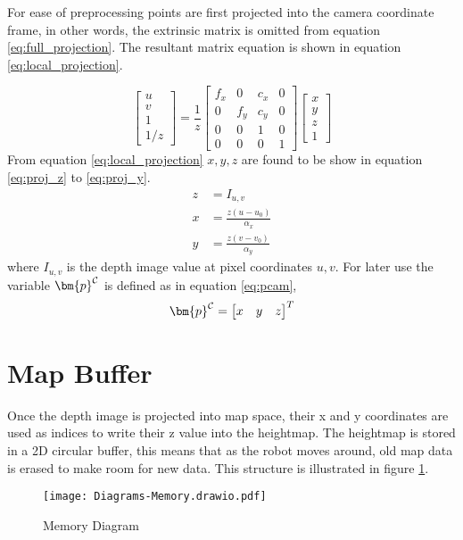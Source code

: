 For ease of preprocessing points are first projected into the camera coordinate frame, in other words, the extrinsic matrix is omitted from equation \ref{eq:full_projection}.
The resultant matrix equation is shown in equation \ref{eq:local_projection}.

\begin{equation} \label{eq:local_projection}
    \begin{bmatrix}
        u \\
        v \\
        1 \\
        1/z
    \end{bmatrix}
    = \frac{1}{z}
    \begin{bmatrix}
        f_x & 0 & c_x & 0 \\
        0 & f_y & c_y & 0 \\
        0 & 0 & 1 & 0 \\
        0 & 0 & 0 & 1
    \end{bmatrix}
    \begin{bmatrix}
        x\\
        y\\
        z\\
        1
    \end{bmatrix}
\end{equation}
From equation \ref{eq:local_projection} \(x,y,z\) are found to be show in equation \ref{eq:proj_z} to \ref{eq:proj_y}.
\begin{align}
    z &= I_{u,v} \label{eq:proj_z}\\[0.2cm]
    x &= \frac{z(u - u_0)}{\alpha_x}\label{eq:proj_x} \\
    y &= \frac{z(v - v_0)}{\alpha_y}\label{eq:proj_y}
\end{align}
where \(I_{u,v}\) is the depth image value at pixel coordinates \(u,v\). For later use the variable \(\bm{p} \inrefframe{C}\) is defined as in equation \ref{eq:pcam},
\begin{equation}\label{eq:pcam}
    \bm{p}\inrefframe{C}=
    \begin{bmatrix}
        x &y &z
    \end{bmatrix}^T
\end{equation}

\newpage
\section{Map Buffer}
    Once the depth image is projected into map space, their x and y coordinates are used as indices to write their z value into the heightmap. The heightmap is stored in
    a 2D circular buffer, this means that as the robot moves around, old map data is erased to make room for new data. This structure is illustrated in figure \ref{fig:memory}.
    \begin{figure}[h]
        \centering
        \texttt{[image: Diagrams-Memory.drawio.pdf]}
        \caption{Memory Diagram}
        \label{fig:memory}
    \end{figure}

